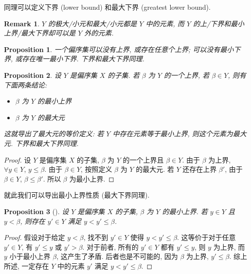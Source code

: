 \documentclass[UTF8]{ctexart}
\theoremstyle{mystyle}
\newtheorem{proposition}{Proposition}[section]
\theoremstyle{myremark}
\newtheorem*{remark}{Remark}
\theoremstyle{plain}
\begin{document}
同理可以定义下界 (lower bound) 和最大下界 (greatest lower bound).

\begin{remark}
    $ Y $ 的极大/小元和最大/小元都是 $ Y $ 中的元素, 而 $ Y $ 的上/下界和最小上界/最大下界却可以是 $ Y $ 外的元素.
\end{remark}

\begin{proposition}
    一个偏序集可以没有上界, 或存在任意个上界; 可以没有最小下界, 或存在唯一最小下界. 下界和最大下界同理.
\end{proposition}



\begin{proposition}
    设 $ Y $ 是偏序集 $ X $ 的子集. 若 $ \beta $ 为 $ Y $ 的一个上界, 若 $ \beta \in Y $, 则有下面两条结论:
    \begin{itemize}
        \item $ \beta $ 为 $ Y $ 的最小上界
        \item $ \beta $ 为 $ Y $ 的最大元
    \end{itemize}

    这就导出了最大元的等价定义: 若 $ Y $ 中存在元素等于最小上界, 则这个元素为最大元. 下界和最大下界同理.
\end{proposition}

\begin{proof}
    设 $ Y $ 是偏序集 $ X $ 的子集, $ \beta $ 为 $ Y $ 的一个上界且 $ \beta \in Y $. 由于 $ \beta $ 为上界, $ \forall y \in Y $, $ y \le \beta $. 由于 $ \beta \in Y $, 按照定义 $ \beta $ 为 $ Y $ 的最大元. 若 $ Y $ 还存在上界 $ \beta' $, 由于 $ \beta \in Y $, $ \beta \le \beta' $. 所以 $ \beta $ 为最小上界.
\end{proof}

就此我们可以导出最小上界性质 (最大下界同理).

\begin{proposition}[]
    设 $ Y $ 是偏序集 $ X $ 的子集, $ \beta $ 为 $ Y $ 的最小上界. 若 $ y \in Y $ 且 $ y < \beta $, 则存在 $ y' \in Y $ 满足 $ y < y' \le \beta $.
\end{proposition}

\begin{proof}
    假设对于给定 $ y < \beta $, 找不到 $ y' \in Y $ 使得 $ y < y' \le \beta $. 这等价于对于任意 $ y' \in Y $, 有 $ y' \le y $ 或 $ y' > \beta $. 对于前者, 所有的 $ y' \in Y $ 都有 $ y' \le y $, 则 $ y $ 为上界, 而 $ y $ 小于最小上界 $ \beta $, 这产生了矛盾. 后者也是不可能的, 因为 $ \beta $ 为上界, $ y' \le \beta $. 综上所述, 一定存在 $ Y $ 中的元素 $ y' $ 满足 $ y < y' \le \beta $.
\end{proof}
\end{document}
